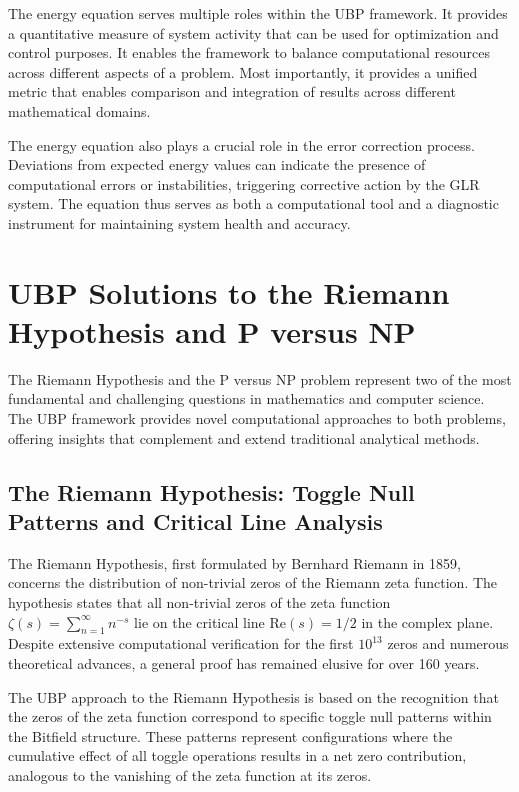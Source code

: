 \documentclass[11pt]{amsart}
\begin{document}
The energy equation serves multiple roles within the UBP framework. It provides a quantitative measure of system activity that can be used for optimization and control purposes. It enables the framework to balance computational resources across different aspects of a problem. Most importantly, it provides a unified metric that enables comparison and integration of results across different mathematical domains.

The energy equation also plays a crucial role in the error correction process. Deviations from expected energy values can indicate the presence of computational errors or instabilities, triggering corrective action by the GLR system. The equation thus serves as both a computational tool and a diagnostic instrument for maintaining system health and accuracy.

\section{UBP Solutions to the Riemann Hypothesis and P versus NP}

The Riemann Hypothesis and the P versus NP problem represent two of the most fundamental and challenging questions in mathematics and computer science. The UBP framework provides novel computational approaches to both problems, offering insights that complement and extend traditional analytical methods.

\subsection{The Riemann Hypothesis: Toggle Null Patterns and Critical Line Analysis}

The Riemann Hypothesis, first formulated by Bernhard Riemann in 1859, concerns the distribution of non-trivial zeros of the Riemann zeta function. The hypothesis states that all non-trivial zeros of the zeta function $\zeta(s) = \sum_{n=1}^{\infty} n^{-s}$ lie on the critical line $\text{Re}(s) = 1/2$ in the complex plane. Despite extensive computational verification for the first $10^{13}$ zeros and numerous theoretical advances, a general proof has remained elusive for over 160 years.

The UBP approach to the Riemann Hypothesis is based on the recognition that the zeros of the zeta function correspond to specific toggle null patterns within the Bitfield structure. These patterns represent configurations where the cumulative effect of all toggle operations results in a net zero contribution, analogous to the vanishing of the zeta function at its zeros.
\end{document}
